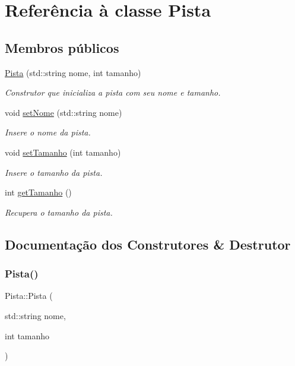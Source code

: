 \hypertarget{classPista}{}\section{Referência à classe Pista}
\label{classPista}
\subsection*{Membros públicos}
\begin{DoxyCompactItemize}
\item 
\hyperlink{classPista_a037a3c407c56d95fa98c6e0525de28cc}{Pista} (std\+::string nome, int tamanho)
\begin{DoxyCompactList}\small\item\em Construtor que inicializa a pista com seu nome e tamanho. \end{DoxyCompactList}\item 
void \hyperlink{classPista_ad0c553cfa88f083810eb6259e328df7b}{set\+Nome} (std\+::string nome)
\begin{DoxyCompactList}\small\item\em Insere o nome da pista. \end{DoxyCompactList}\item 
void \hyperlink{classPista_a08d26ad19e300462d05208e6e15b56e7}{set\+Tamanho} (int tamanho)
\begin{DoxyCompactList}\small\item\em Insere o tamanho da pista. \end{DoxyCompactList}\item 
int \hyperlink{classPista_af77d7913dcf238a5c5a11beafc4e49ce}{get\+Tamanho} ()
\begin{DoxyCompactList}\small\item\em Recupera o tamanho da pista. \end{DoxyCompactList}\end{DoxyCompactItemize}


\subsection{Documentação dos Construtores \& Destrutor}
\mbox{\label{classPista_a037a3c407c56d95fa98c6e0525de28cc}} 
\subsubsection{\texorpdfstring{Pista()}{Pista()}}
{\footnotesize\ttfamily Pista\+::\+Pista (\begin{DoxyParamCaption}\item[{std\+::string}]{nome,  }\item[{int}]{tamanho }\end{DoxyParamCaption})}



